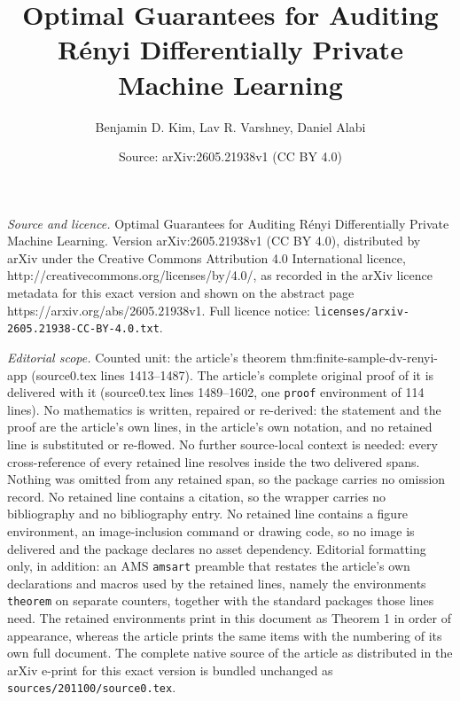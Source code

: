 \documentclass[10pt,a4paper]{amsart}
\title{Optimal Guarantees for Auditing R\'enyi Differentially Private Machine Learning}
\author{Benjamin D. Kim, Lav R. Varshney, Daniel Alabi}
\date{Source: arXiv:2605.21938v1 (CC BY 4.0)}
\begin{document}
\maketitle

\noindent\emph{Source and licence.} Optimal Guarantees for Auditing R\'enyi Differentially Private Machine Learning. Version arXiv:2605.21938v1 (CC BY 4.0), distributed by arXiv under the Creative Commons Attribution 4.0 International licence, http://creativecommons.org/licenses/by/4.0/, as recorded in the arXiv licence metadata for this exact version and shown on the abstract page https://arxiv.org/abs/2605.21938v1. Full licence notice: \texttt{licenses/arxiv-2605.21938-CC-BY-4.0.txt}.\par\smallskip

\noindent\textit{Editorial scope.} Counted unit: the article's theorem thm:finite-sample-dv-renyi-app (source0.tex lines 1413--1487). The article's complete original proof of it is delivered with it (source0.tex lines 1489--1602, one \texttt{proof} environment of 114 lines). No mathematics is written, repaired or re-derived: the statement and the proof are the article's own lines, in the article's own notation, and no retained line is substituted or re-flowed.  No further source-local context is needed: every cross-reference of every retained line resolves inside the two delivered spans.  Nothing was omitted from any retained span, so the package carries no omission record.  No retained line contains a citation, so the wrapper carries no bibliography and no bibliography entry.  No retained line contains a figure environment, an image-inclusion command or drawing code, so no image is delivered and the package declares no asset dependency.  Editorial formatting only, in addition: an AMS \texttt{amsart} preamble that restates the article's own declarations and macros used by the retained lines, namely the environments \texttt{theorem} on separate counters, together with the standard packages those lines need.  The retained environments print in this document as Theorem 1 in order of appearance, whereas the article prints the same items with the numbering of its own full document.  The complete native source of the article as distributed in the arXiv e-print for this exact version is bundled unchanged as \texttt{sources/201100/source0.tex}.
\end{document}
